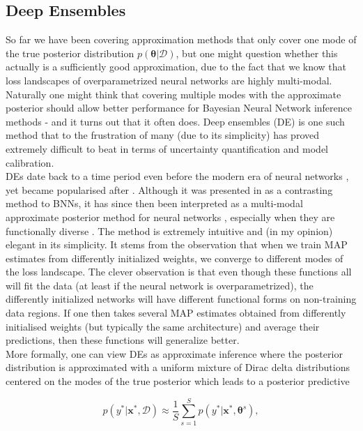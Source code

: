 \subsection{Deep Ensembles}
\label{sec:DEs}
So far we have been covering approximation methods that only cover one mode of the true posterior distribution $p(\bm{\theta}|\mathcal{D})$, but one might question whether this actually is a sufficiently good approximation, due to the fact that we know that loss landscapes of overparametrized neural networks are highly multi-modal. Naturally one might think that covering multiple modes with the approximate posterior should allow better performance for Bayesian Neural Network inference methods - and it turns out that it often does. Deep ensembles (DE) is one such method that to the frustration of many (due to its simplicity) has proved extremely difficult to beat in terms of uncertainty quantification and model calibration.\\

\noindent DEs date back to a time period even before the modern era of neural networks \citep{1990_LKAIDE}, yet became popularised after \cite{2017_DE}. Although it was presented in \cite{2017_DE} as a contrasting method to BNNs, it has since then been interpreted as a multi-modal approximate posterior method for neural networks \citep{Izmailov2021WhatAB,2021_DEsBNNs}, especially when they are functionally diverse \citep{2021_RepulsiveDEs}. The method is extremely intuitive and (in my opinion) elegant in its simplicity. It stems from the observation that when we train MAP estimates from differently initialized weights, we converge to different modes of the loss landscape. The clever observation is that even though these functions all will fit the data (at least if the neural network is overparametrized), the differently initialized networks will have different functional forms on non-training data regions. If one then takes several MAP estimates obtained from differently initialised weights (but typically the same architecture) and average their predictions, then these functions will generalize better. \\

\noindent More formally, one can view DEs as approximate inference where the posterior distribution is approximated with a uniform mixture of Dirac delta distributions centered on the modes of the true posterior which leads to a posterior predictive

\begin{equation}
    p(y^*|\mathbf{x}^*, \mathcal{D}) \approx \frac{1}{S} \sum^S_{s=1}p(y^*|\mathbf{x}^*,\bm{\theta}^s),
\end{equation}

